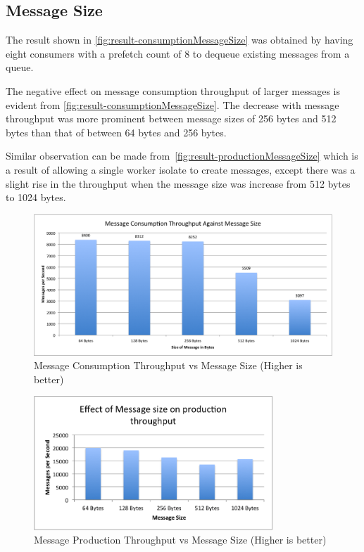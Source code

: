 \subsection{Message Size}
\label{subsec:messageSize}
The result shown in \autoref{fig:result-consumptionMessageSize} was obtained by having eight consumers with a prefetch count of 8 to dequeue existing messages from a queue.

  The negative effect on message consumption throughput of larger messages is evident from \autoref{fig:result-consumptionMessageSize}. The decrease with message throughput was more prominent between message sizes of 256 bytes and 512 bytes than that of between 64 bytes and 256 bytes.

  Similar observation can be made from~\autoref{fig:result-productionMessageSize} which is a result of allowing a single worker isolate to create messages, except there was a slight rise in the throughput when the message size was increase from 512 bytes to 1024 bytes.

\begin{figure}[H]
  \centering  \includegraphics[width=1\textwidth]{figures/02consumptionMessageSize}
  \caption[Message Consumption Throughput vs Message Size]{Message Consumption Throughput vs Message Size (Higher is better)}
  \label{fig:result-consumptionMessageSize}
\end{figure}

\begin{figure}[H]
  \centering  \includegraphics[width=0.8\textwidth]{figures/03productionMessageSize}
  \caption[Message Production Throughput vs Message Size]{Message Production Throughput vs Message Size (Higher is better)}
  \label{fig:result-productionMessageSize}
\end{figure}

